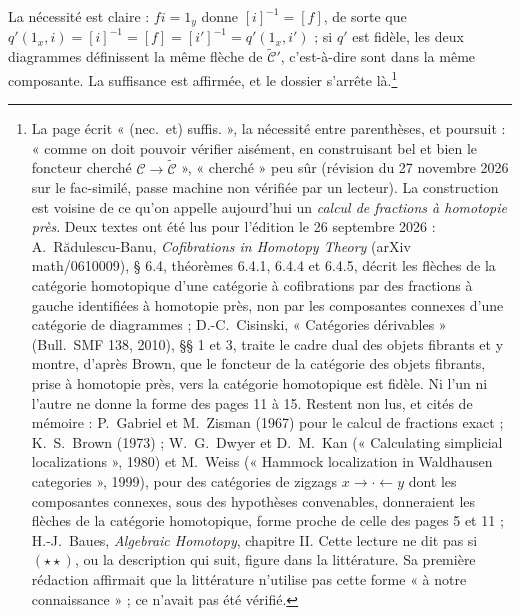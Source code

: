 \documentclass[11pt,a4paper]{article}
\begin{document}
La nécessité est claire : $f i = 1_{y}$ donne $[i]^{-1} = [f]$, de sorte que
$q'(1_{x}, i) = [i]^{-1} = [f] = [i']^{-1} = q'(1_{x}, i')$ ; si $q'$ est
fidèle, les deux diagrammes définissent la même flèche de
$\widetilde{\mathcal{C}}'$, c'est-à-dire sont dans la même composante. La suffisance est affirmée, et le dossier s'arrête
là.\footnote{La page écrit « (nec.\ et) suffis. », la nécessité entre
parenthèses, et poursuit : « comme on doit pouvoir vérifier aisément, en
construisant bel et bien le foncteur cherché $\mathcal{C} \to
\widetilde{\mathcal{C}}$ », « cherché » peu sûr (révision du 27 novembre 2026
sur le fac-similé, passe machine non vérifiée par un lecteur). La construction est voisine de ce qu'on appelle aujourd'hui un
\emph{calcul de fractions à homotopie près}. Deux textes ont été lus pour
l'édition le 26 septembre 2026 : A.~Rădulescu-Banu, \emph{Cofibrations in
Homotopy Theory} (arXiv math/0610009), § 6.4, théorèmes 6.4.1, 6.4.4 et
6.4.5, décrit les flèches de la catégorie homotopique d'une catégorie à
cofibrations par des fractions à gauche identifiées à homotopie près, non
par les composantes connexes d'une catégorie de diagrammes ; D.-C.~Cisinski,
« Catégories dérivables » (Bull.\ SMF 138, 2010), §§ 1 et 3, traite le
cadre dual des objets fibrants et y montre, d'après Brown, que le foncteur
de la catégorie des objets fibrants, prise à homotopie près, vers la
catégorie homotopique est fidèle. Ni l'un ni l'autre ne donne la forme des pages 11 à 15. Restent
non lus, et cités de mémoire : P.~Gabriel et M.~Zisman (1967) pour le calcul
de fractions exact ; K.~S.~Brown (1973) ; W.~G.~Dwyer et D.~M.~Kan (« Calculating
simplicial localizations », 1980) et M.~Weiss (« Hammock localization in
Waldhausen categories », 1999), pour des catégories de zigzags
$x \to \cdot \leftarrow y$ dont les composantes connexes, sous des
hypothèses convenables, donneraient les flèches de la catégorie homotopique,
forme proche de celle des pages 5 et 11 ; H.-J.~Baues, \emph{Algebraic
Homotopy}, chapitre II. Cette lecture ne dit pas si $(\star\star)$, ou la
description qui suit, figure dans la littérature. Sa première rédaction
affirmait que la littérature n'utilise pas cette forme « à notre
connaissance » ; ce n'avait pas été vérifié.}
\end{document}
